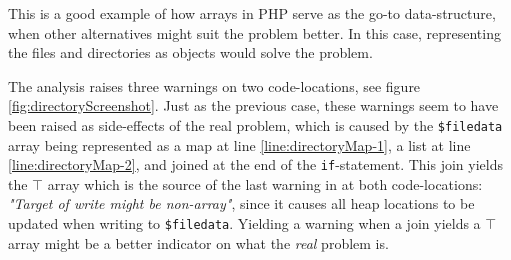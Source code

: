 This is a good example of how arrays in PHP serve as the go-to data-structure, when other alternatives might suit the problem better. In this case, representing the files and directories as objects would solve the problem.


The analysis raises three warnings on two code-locations, see figure \ref{fig:directoryScreenshot}. Just as the previous case, these warnings seem to have been raised as side-effects of the real problem, which is caused by the \texttt{\$filedata} array being represented as a map at line \ref{line:directoryMap-1}, a list at line \ref{line:directoryMap-2}, and joined at the end of the \texttt{if}-statement. This join yields the $\top$ array which is the source of the last warning in at both code-locations: \textit{"Target of write might be non-array"}, since it causes all heap locations to be updated when writing to \texttt{\$filedata}. Yielding a warning when a join yields a $\top$ array might be a better indicator on what the \textit{real} problem is.

